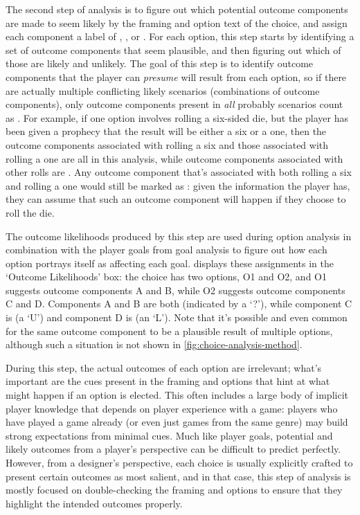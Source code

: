 \label{sec:cp-likelihood-analysis}

The second step of analysis is to figure out which potential outcome components are made to seem likely by the framing and option text of the choice, and assign each component a label of , , or .
%
For each option, this step starts by identifying a set of outcome components that seem plausible, and then figuring out which of those are likely and unlikely.
%
The goal of this step is to identify outcome components that the player can \emph{presume} will result from each option, so if there are actually multiple conflicting likely scenarios (combinations of outcome components), only outcome components present in \emph{all} probably scenarios count as .
%
For example, if one option involves rolling a six-sided die, but the player has been given a prophecy that the result will be either a six or a one, then the outcome components associated with rolling a six and those associated with rolling a one are all  in this analysis, while outcome components associated with other rolls are . 
%
Any outcome component that's associated with both rolling a six and rolling a one would still be marked as : given the information the player has, they can assume that such an outcome component will happen if they choose to roll the die.


The outcome likelihoods produced by this step are used during option analysis in combination with the player goals from goal analysis to figure out how each option portrays itself as affecting each goal.
%
 displays these assignments in the `Outcome Likelihoods' box: the choice has two options, O1 and O2, and O1 suggests outcome components A and B, while O2 suggests outcome components C and D.
%
Components A and B are both  (indicated by a `?'), while component C is  (a `U') and component D is  (an `L').
%
Note that it's possible and even common for the same outcome component to be a plausible result of multiple options, although such a situation is not shown in \cref{fig:choice-analysis-method}.


During this step, the actual outcomes of each option are irrelevant; what's important are the cues present in the framing and options that hint at what might happen if an option is elected.
%
This often includes a large body of implicit player knowledge that depends on player experience with a game: players who have played a game already (or even just games from the same genre) may build strong expectations from minimal cues.
%
Much like player goals, potential and likely outcomes from a player's perspective can be difficult to predict perfectly.
%
However, from a designer's perspective, each choice is usually explicitly crafted to present certain outcomes as most salient, and in that case, this step of analysis is mostly focused on double-checking the framing and options to ensure that they highlight the intended outcomes properly.


